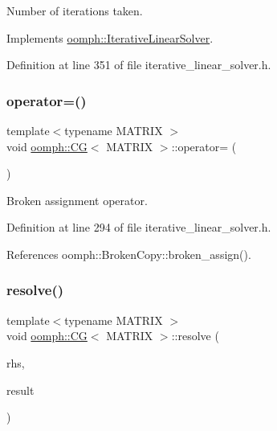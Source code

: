 Number of iterations taken. 



Implements \hyperlink{classoomph_1_1IterativeLinearSolver_a5fe7f7b5e4847fdbd4f95d3875ec7a46}{oomph\+::\+Iterative\+Linear\+Solver}.



Definition at line 351 of file iterative\+\_\+linear\+\_\+solver.\+h.

\mbox{\label{classoomph_1_1CG_ae10b7f5ed64c0f9c46976b2b5e33312f}} 
\subsubsection{\texorpdfstring{operator=()}{operator=()}}
{\footnotesize\ttfamily template$<$typename M\+A\+T\+R\+IX $>$ \\
void \hyperlink{classoomph_1_1CG}{oomph\+::\+CG}$<$ M\+A\+T\+R\+IX $>$\+::operator= (\begin{DoxyParamCaption}\item[{const \hyperlink{classoomph_1_1CG}{CG}$<$ M\+A\+T\+R\+IX $>$ \&}]{ }\end{DoxyParamCaption})\hspace{0.3cm}{\ttfamily [inline]}}



Broken assignment operator. 



Definition at line 294 of file iterative\+\_\+linear\+\_\+solver.\+h.



References oomph\+::\+Broken\+Copy\+::broken\+\_\+assign().

\mbox{\label{classoomph_1_1CG_a147e640c19c2159285da0b3b5c51af63}} 
\subsubsection{\texorpdfstring{resolve()}{resolve()}}
{\footnotesize\ttfamily template$<$typename M\+A\+T\+R\+IX $>$ \\
void \hyperlink{classoomph_1_1CG}{oomph\+::\+CG}$<$ M\+A\+T\+R\+IX $>$\+::resolve (\begin{DoxyParamCaption}\item[{const \hyperlink{classoomph_1_1DoubleVector}{Double\+Vector} \&}]{rhs,  }\item[{\hyperlink{classoomph_1_1DoubleVector}{Double\+Vector} \&}]{result }\end{DoxyParamCaption})\hspace{0.3cm}{\ttfamily [virtual]}}



